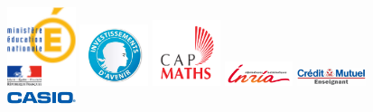 \begin{figure}[h!]

   \begin{minipage}[c]{2cm}
   \centering
        \includegraphics[width=2cm]{logos/EN.jpg}
   \end{minipage} \hfill
   \begin{minipage}[c]{2cm}
   \centering
      \includegraphics[width=2cm]{logos/PAI.jpeg}
   \end{minipage} \hfill
   \begin{minipage}[c]{2cm}
   \centering
      \includegraphics[width=2cm]{logos/CAPMATH_Logo_2Coul.pdf}
   \end{minipage} \hfill
      \begin{minipage}[c]{2cm}
   \centering
      \includegraphics[width=2cm]{logos/inria.jpg}
   \end{minipage}
   \hfill\begin{minipage}[c]{2cm}
   \centering
        \includegraphics[width=2cm]{logos/cm.jpg}
   \end{minipage}  \hfill
   \begin{minipage}[c]{2cm}
   \centering
      \includegraphics[width=2cm]{logos/casio.jpg}
   \end{minipage}

\end{figure}



